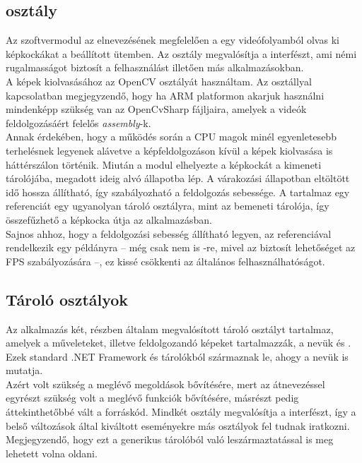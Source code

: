 \subsection{ osztály}

Az szoftvermodul az elnevezésének megfelelően a egy videófolyamból olvas ki képkockákat a beállított ütemben. Az osztály megvalósítja a  interfészt, ami némi rugalmasságot biztosít a felhasználást illetően más alkalmazásokban. \\
A képek kiolvasásához az OpenCV  osztályát használtam. Az osztállyal kapcsolatban megjegyzendő, hogy ha ARM platformon akarjuk használni mindenképp szükség van az OpenCvSharp  fájljaira, amelyek a videók feldolgozásáért felelős \textit{assembly}-k.\\
Annak érdekében, hogy a működés során a CPU magok minél egyenletesebb terhelésnek legyenek alávetve a képfeldolgozáson kívül a képek kiolvasása is háttérszálon történik. Miután a modul elhelyezte a képkockát a kimeneti tárolójába, megadott ideig alvó állapotba lép. A várakozási állapotban eltöltött idő hossza állítható, így szabályozható a feldolgozás sebessége. A  tartalmaz egy referenciát egy ugyanolyan tároló osztályra, mint az  bemeneti tárolója, így összefűzhető a képkocka útja az alkalmazásban.\\
Sajnos ahhoz, hogy a feldolgozási sebesség állítható legyen, az  referenciával rendelkezik egy  példányra -- még csak nem is -re, mivel az biztosít lehetőséget az FPS szabályozására --, ez kissé csökkenti az általános felhasználhatóságot.

\subsection{Tároló osztályok}

Az alkalmazás két, részben általam megvalósított tároló osztályt tartalmaz, amelyek a műveleteket, illetve feldolgozandó képeket tartalmazzák, a nevük  és . Ezek standard .NET Framework  és  tárolókból származnak le, ahogy a nevük is mutatja.\\
Azért volt szükség a meglévő megoldások bővítésére, mert az átnevezéssel egyrészt szükség volt a meglévő funkciók bővítésére, másrészt pedig áttekinthetőbbé vált a forráskód. Mindkét osztály megvalósítja a   interfészt, így a belső változások által kiváltott eseményekre más osztályok fel tudnak iratkozni. Megjegyzendő, hogy ezt a  generikus tárolóból való leszármaztatással is meg lehetett volna oldani.

